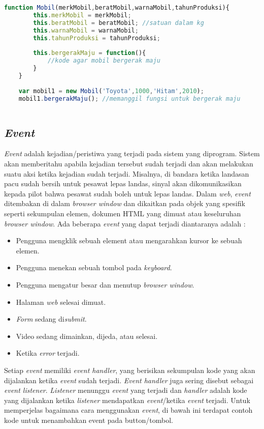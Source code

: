 \begin{lstlisting}[language=Javascript, caption=Membuat dan memanggil method bergerakMaju()]
	function Mobil(merkMobil,beratMobil,warnaMobil,tahunProduksi){
		this.merkMobil = merkMobil;
		this.beratMobil = beratMobil; //satuan dalam kg
		this.warnaMobil = warnaMobil;
		this.tahunProduksi = tahunProduksi;
		
		this.bergerakMaju = function(){
			//kode agar mobil bergerak maju
		}
	}
	
	var mobil1 = new Mobil('Toyota',1000,'Hitam',2010);
	mobil1.bergerakMaju(); //memanggil fungsi untuk bergerak maju
	
\end{lstlisting}

\subsection{\textit{Event}}
\textit{Event} adalah kejadian/peristiwa yang terjadi pada sistem yang diprogram. Sistem akan memberitahu apabila kejadian tersebut sudah terjadi dan akan melakukan suatu aksi ketika kejadian sudah terjadi. Misalnya, di bandara ketika landasan pacu sudah bersih untuk pesawat lepas landas, sinyal akan dikomunikasikan kepada pilot bahwa pesawat sudah boleh untuk lepas landas. Dalam \textit{web}, \textit{event} ditembakan di dalam \textit{browser window} dan dikaitkan pada objek yang spesifik seperti sekumpulan elemen, dokumen HTML yang dimuat atau keseluruhan \textit{browser window}. Ada beberapa \textit{event} yang dapat terjadi diantaranya adalah : 

\begin{itemize}
	\item Pengguna mengklik sebuah element atau mengarahkan kursor ke sebuah elemen.
	\item Pengguna menekan sebuah tombol pada \textit{keyboard}.
	\item Pengguna mengatur besar dan menutup \textit{browser window}.
	\item Halaman \textit{web} selesai dimuat.
	\item \textit{Form} sedang di\textit{submit}.
	\item Video sedang dimainkan, dijeda, atau selesai.
	\item Ketika \textit{error} terjadi.
\end{itemize}

Setiap \textit{event} memiliki \textit{event handler}, yang berisikan sekumpulan kode yang akan dijalankan ketika \textit{event} sudah terjadi. \textit{Event handler} juga sering disebut sebagai \textit{event listener}. \textit{Listener} menunggu \textit{event} yang terjadi dan \textit{handler} adalah kode yang dijalankan ketika \textit{listener} mendapatkan \textit{event}/ketika \textit{event} terjadi. Untuk memperjelas bagaimana cara menggunakan \textit{event}, di bawah ini terdapat contoh kode untuk menambahkan event pada button/tombol.


